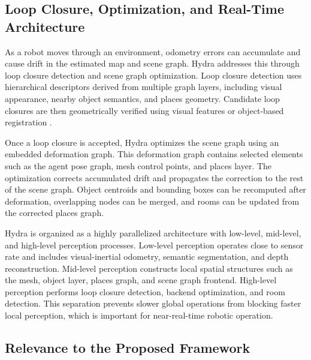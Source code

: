 \subsection{Loop Closure, Optimization, and Real-Time Architecture}

{\small

As a robot moves through an environment, odometry errors can accumulate and cause drift in the estimated map and scene graph. Hydra addresses this through loop closure detection and scene graph optimization. Loop closure detection uses hierarchical descriptors derived from multiple graph layers, including visual appearance, nearby object semantics, and places geometry. Candidate loop closures are then geometrically verified using visual features or object-based registration \cite{hughes2022hydra}.

Once a loop closure is accepted, Hydra optimizes the scene graph using an embedded deformation graph. This deformation graph contains selected elements such as the agent pose graph, mesh control points, and places layer. The optimization corrects accumulated drift and propagates the correction to the rest of the scene graph. Object centroids and bounding boxes can be recomputed after deformation, overlapping nodes can be merged, and rooms can be updated from the corrected places graph.

Hydra is organized as a highly parallelized architecture with low-level, mid-level, and high-level perception processes. Low-level perception operates close to sensor rate and includes visual-inertial odometry, semantic segmentation, and depth reconstruction. Mid-level perception constructs local spatial structures such as the mesh, object layer, places graph, and scene graph frontend. High-level perception performs loop closure detection, backend optimization, and room detection. This separation prevents slower global operations from blocking faster local perception, which is important for near-real-time robotic operation.

}

\subsection{Relevance to the Proposed Framework}

